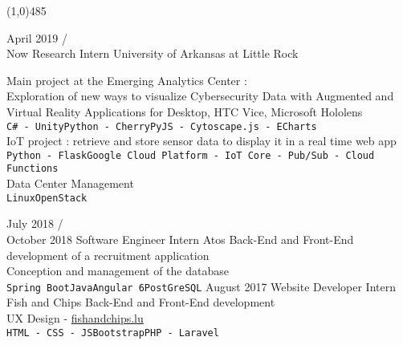 \documentclass[9pt]{developercv} %
\begin{document}
\line(1,0){485}




\begin{entrylist}
	\entry
		{April 2019 / \\ Now}
		{Research Intern}
		{University of Arkansas at Little Rock}
		{Main project at the Emerging Analytics Center : \\
		Exploration of new ways to visualize Cybersecurity Data with Augmented and Virtual Reality
		Applications for Desktop, HTC Vice, Microsoft Hololens
		\\ \texttt{C\# - Unity}\slashsep\texttt{Python - CherryPy}\slashsep\texttt{JS - Cytoscape.js - ECharts} \\
		
		IoT project : retrieve and store sensor data to display it in a real time web app 
		 \\ \texttt{Python - Flask}\slashsep\texttt{Google Cloud Platform - IoT Core - Pub/Sub - Cloud Functions} \\
		 
		 Data Center Management
		 \\ \texttt{Linux}\slashsep\texttt{OpenStack}
		
		}
		
		
	\entry		
		{July 2018 / \\ October 2018}
		{Software Engineer Intern}
		{Atos}
		{Back-End and Front-End development of a recruitment application \\
		Conception and management of the database
		\\ \texttt{Spring Boot}\slashsep\texttt{Java}\slashsep\texttt{Angular 6}\slashsep\texttt{PostGreSQL}}
	\entry
		{August 2017}
		{Website Developer Intern}
		{Fish and Chips}
		{Back-End and Front-End development \\
		UX Design - {\href{https://fishandchips.lu/}{fishandchips.lu}}
		\\ \texttt{HTML - CSS - JS}\slashsep\texttt{Bootstrap}\slashsep\texttt{PHP - Laravel}}
\end{entrylist}

\end{document}
